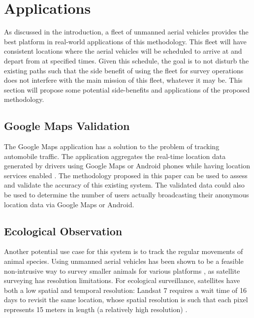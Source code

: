 \documentclass[conf]{new-aiaa}
\begin{document}

\section{Applications}

As discussed in the introduction, a fleet of unmanned aerial vehicles provides the best platform in real-world applications of this methodology. This fleet will have consistent locations where the aerial vehicles will be scheduled to arrive at and depart from at specified times. Given this schedule, the goal is to not disturb the existing paths such that the side benefit of using the fleet for survey operations does not interfere with the main mission of this fleet, whatever it may be. This section will propose some potential side-benefits and applications of the proposed methodology.

\subsection{Google Maps Validation}
The Google Maps application has a solution to the problem of tracking automobile traffic. The application aggregates the real-time location data generated by drivers using Google Maps or Android phones while having location services enabled \cite{barth2009googlemaps}. The methodology proposed in this paper can be used to assess and validate the accuracy of this existing system. The validated data could also be used to determine the number of users actually broadcasting their anonymous location data via Google Maps or Android.

\subsection{Ecological Observation}
Another potential use case for this system is to track the regular movements of animal species. Using unmanned aerial vehicles has been shown to be a feasible non-intrusive way to survey smaller animals for various platforms \cite{mcevoy2016disturbanceEffectsSpeciesRecognition}, as satellite surveying has resolution limitations. For ecological surveillance, satellites have both a low spatial and temporal resolution: Landsat 7 requires a wait time of 16 days to revisit the same location, whose spatial resolution is such that each pixel represents 15 meters in length (a relatively high resolution) \cite{kerr2003fromSpaceToSpecies}.
\end{document}
